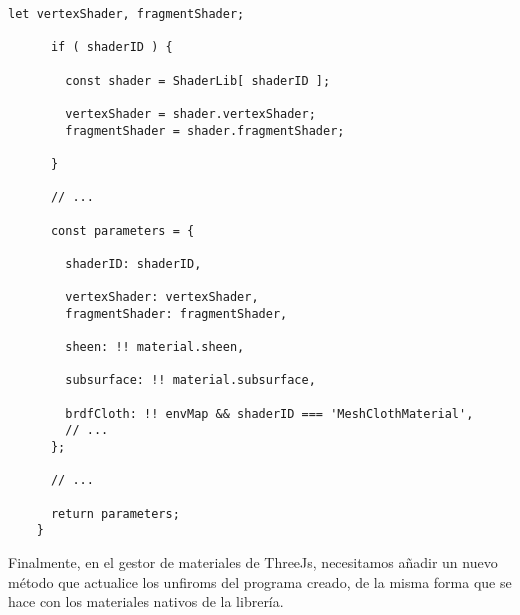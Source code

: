 \begin{lstlisting}[caption=Clase MeshClothMaterial]
      let vertexShader, fragmentShader;
  
      if ( shaderID ) {
  
        const shader = ShaderLib[ shaderID ];
  
        vertexShader = shader.vertexShader;
        fragmentShader = shader.fragmentShader;
  
      }
  
      // ...
  
      const parameters = {
  
        shaderID: shaderID,
  
        vertexShader: vertexShader,
        fragmentShader: fragmentShader,
  
        sheen: !! material.sheen,
  
        subsurface: !! material.subsurface,
  
        brdfCloth: !! envMap && shaderID === 'MeshClothMaterial',
        // ...
      };
  
      // ...
  
      return parameters;
    }
  \end{lstlisting}
  
  Finalmente, en el gestor de materiales de ThreeJs, necesitamos a\~nadir un nuevo m\'etodo
  que actualice los unfiroms del programa creado, de la misma forma que se hace con los
  materiales nativos de la librer\'ia.\newline
  
